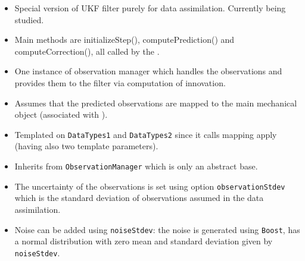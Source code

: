 \documentclass[10pt]{article}
\begin{document}
\medskip
{\large \ukfsc}
\begin{itemize}
\item Special version of UKF filter purely for data assimilation. Currently being studied.
\item Main methods are initializeStep(), computePrediction() and computeCorrection(), all called by the \al.
\end{itemize}
\medskip
{\large\mobs}
\begin{itemize}
\item One instance of observation manager which handles the observations and provides them to the filter via computation of innovation.
\item Assumes that the predicted observations are mapped to the main mechanical object (associated with \ssw).
\item Templated on \texttt{DataTypes1} and \texttt{DataTypes2} since it calls mapping apply (having also two template parameters).
\item Inherits from \texttt{ObservationManager} which is only an abstract base.
\item The uncertainty of the observations is set using option \texttt{observationStdev} which is the standard deviation of observations assumed in the data assimilation.
\item Noise can be added using \texttt{noiseStdev}: the noise is generated using \texttt{Boost}, has a normal distribution with zero mean and standard deviation given by \texttt{noiseStdev}.
\end{itemize}
\medskip
{\large\opr}
\end{document}

